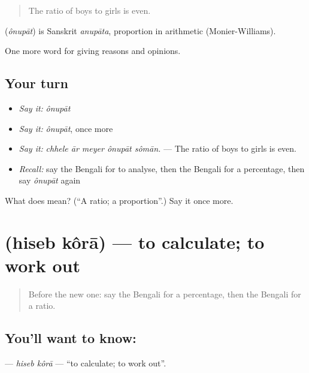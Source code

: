 \begin{quote}
The ratio of boys to girls is even.
\end{quote}

\begin{cousinweb}
\textbf{} (\emph{ônupāt}) is Sanskrit \emph{anupāta}, proportion in arithmetic (Monier-Williams).
\end{cousinweb}

\begin{grammarlens}[title={What you've built}]
One more word for giving reasons and opinions.
\end{grammarlens}

\subsection*{Your turn}
\begin{itemize}
\raggedright
  \item \emph{Say it:} \emph{ônupāt}
  \item \emph{Say it:} \emph{ônupāt}, once more
  \item \emph{Say it:} \emph{chhele ār meyer ônupāt sômān.} — The ratio of boys to girls is even.
  \item \emph{Recall:} say the Bengali for to analyse, then the Bengali for a percentage, then say \emph{ônupāt} again
\end{itemize}

\begin{tcolorbox}[breakable,colback=teal!4,colframe=teal!35!black,title={Before you move on}]
What does  mean? (\textquotedblleft{}A ratio; a proportion\textquotedblright{}.) Say it once more.
\end{tcolorbox}
\section[\texorpdfstring{\bn{হিসেব} \bn{করা} (hiseb kôrā)}{হিসেব করা (hiseb kôrā)}]{  (hiseb kôrā) — to calculate; to work out}

\label{lesson:BN-C356-hiseb-kora}



\begin{quote}
Before the new one: say the Bengali for a percentage, then the Bengali for a ratio.
\end{quote}

\subsection*{You'll want to know:  }
\textbf{ } — \emph{hiseb kôrā} — \textquotedblleft{}to calculate; to work out\textquotedblright{}.

